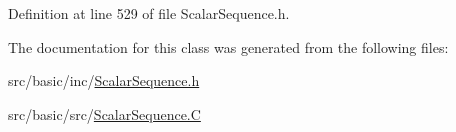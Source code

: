 Definition at line 529 of file Scalar\-Sequence.\-h.



The documentation for this class was generated from the following files\-:\begin{DoxyCompactItemize}
\item 
src/basic/inc/\hyperlink{_scalar_sequence_8h}{Scalar\-Sequence.\-h}\item 
src/basic/src/\hyperlink{_scalar_sequence_8_c}{Scalar\-Sequence.\-C}\end{DoxyCompactItemize}
